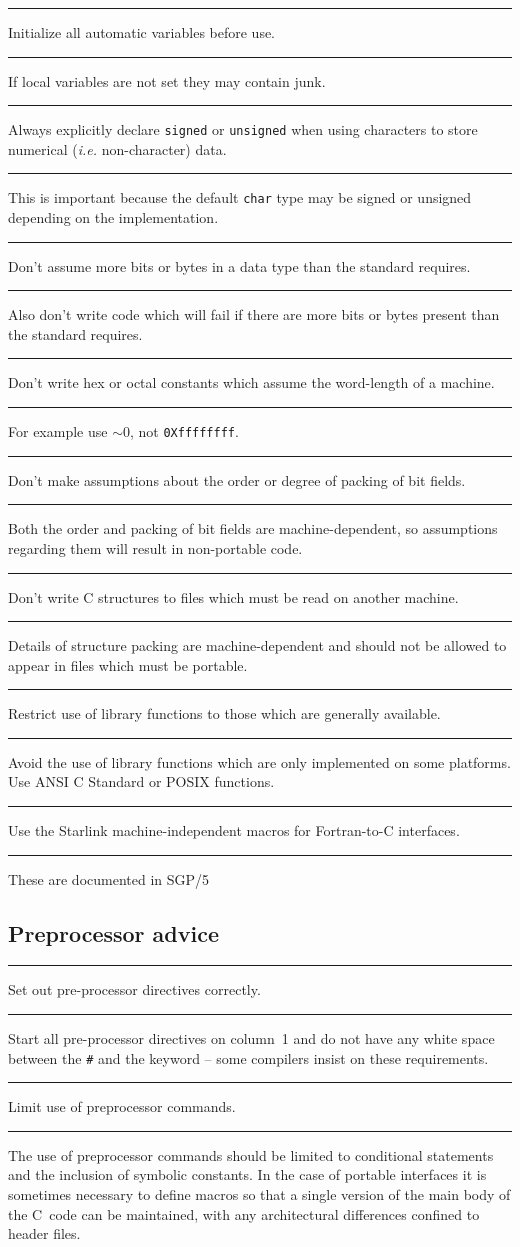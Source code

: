 \documentclass[twoside,11pt]{article}
\newcommand{\xref}[3]{#1}
\newcounter{sruleno}
\newcommand{\srule}[1]{
    \addtocounter{sruleno}{1}
    \goodbreak
    \rule[0.5ex]{\textwidth}{0.3mm}
    {\Large #1 \hfill {\thesruleno}}
    \rule[0.5ex]{\textwidth}{0.1mm}
}
\newcommand{\srule}[1]{
       \addtocounter{sruleno}{1}
       \begin{rawhtml} <HR> \end{rawhtml}
       {\Large \thesruleno}~~~~{\Large #1}
       \begin{rawhtml} <HR> \end{rawhtml}
       \end{tabular}
  }
\begin{document}
\srule{Initialize all automatic variables before use.}
If local variables are not set they may contain junk.

\srule{Always explicitly declare {\tt signed} or {\tt unsigned} when using
characters to store  numerical ({\sl i.e.} non-character) data.}
This is important because
the default {\tt char} type may be signed
or unsigned depending on the implementation.


\srule{Don't assume more bits or bytes in a data type than the standard
 requires.}
Also don't write code which will fail if there are more bits or bytes present
than the standard requires.


\srule{Don't write hex or octal constants which assume the word-length of a
machine.}
For example use {\tt$\sim0$}, not {\tt 0Xffffffff}.


\srule{Don't make assumptions about the order or degree of packing of
bit fields.}
Both the order and packing of bit fields are machine-dependent, so
assumptions regarding them will result in non-portable code.

\srule{Don't write C structures to files which must be read on another
machine.}
Details of structure packing are machine-dependent and should not be allowed
to appear in files which must be portable.

\srule{Restrict use of library functions to those which are
generally available.}
Avoid the use of library functions which are only implemented
on some platforms. Use ANSI C Standard or POSIX functions.

\srule{Use the Starlink machine-independent macros for Fortran-to-C
interfaces.}
These are documented in \xref{SGP/5}{sgp5}.

\subsection{Preprocessor advice}


\srule{Set out pre-processor directives correctly.}
Start all pre-processor directives on column~1 and do not have any white
space between the {\tt \#} and the keyword -- some compilers insist on
these requirements.

\srule{Limit use of preprocessor commands.}
The use of preprocessor commands should be limited to conditional
statements and the inclusion of symbolic constants.
In the case of portable interfaces it is sometimes necessary to define
macros so that a single version of the main body of the C~code can be
maintained,
with any architectural differences confined to header files.
\end{document}
